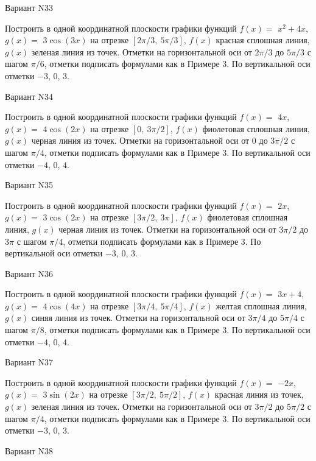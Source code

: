 \documentclass[11pt]{report}
\begin{document}
Вариант N33

Построить в одной координатной плоскости графики функций $f(x) = $
    $x^{2} + 4 x$, $g(x) = $
    $3 \cos{\left(3 x \right)}$ на 
    отрезке $\left[ 2 \pi / 3, \  5 \pi / 3\right]$, $f(x)$ красная 
    сплошная линия, $g(x)$ зеленая линия из точек. 
    Отметки на горизонтальной оси от $2 \pi / 3$ до $5 \pi / 3$ с 
    шагом $\pi / 6$, отметки подписать формулами как в Примере 3.  
    По вертикальной оси отметки $-3$, 0, $3$.

Вариант N34

Построить в одной координатной плоскости графики функций $f(x) = $
    $4 x$, $g(x) = $
    $4 \cos{\left(2 x \right)}$ на 
    отрезке $\left[ 0, \  3 \pi / 2\right]$, $f(x)$ фиолетовая 
    сплошная линия, $g(x)$ черная линия из точек. 
    Отметки на горизонтальной оси от $0$ до $3 \pi / 2$ с 
    шагом $\pi / 4$, отметки подписать формулами как в Примере 3.  
    По вертикальной оси отметки $-4$, 0, $4$.

Вариант N35

Построить в одной координатной плоскости графики функций $f(x) = $
    $2 x$, $g(x) = $
    $3 \cos{\left(2 x \right)}$ на 
    отрезке $\left[ 3 \pi / 2, \  3 \pi\right]$, $f(x)$ фиолетовая 
    сплошная линия, $g(x)$ черная линия из точек. 
    Отметки на горизонтальной оси от $3 \pi / 2$ до $3 \pi$ с 
    шагом $\pi / 4$, отметки подписать формулами как в Примере 3.  
    По вертикальной оси отметки $-3$, 0, $3$.

Вариант N36

Построить в одной координатной плоскости графики функций $f(x) = $
    $3 x + 4$, $g(x) = $
    $4 \cos{\left(4 x \right)}$ на 
    отрезке $\left[ 3 \pi / 4, \  5 \pi / 4\right]$, $f(x)$ желтая 
    сплошная линия, $g(x)$ синяя линия из точек. 
    Отметки на горизонтальной оси от $3 \pi / 4$ до $5 \pi / 4$ с 
    шагом $\pi / 8$, отметки подписать формулами как в Примере 3.  
    По вертикальной оси отметки $-4$, 0, $4$.

Вариант N37

Построить в одной координатной плоскости графики функций $f(x) = $
    $- 2 x$, $g(x) = $
    $3 \sin{\left(2 x \right)}$ на 
    отрезке $\left[ 3 \pi / 2, \  5 \pi / 2\right]$, $f(x)$ красная 
    линия из точек, $g(x)$ зеленая линия из точек. 
    Отметки на горизонтальной оси от $3 \pi / 2$ до $5 \pi / 2$ с 
    шагом $\pi / 4$, отметки подписать формулами как в Примере 3.  
    По вертикальной оси отметки $-3$, 0, $3$.

Вариант N38
\end{document}
